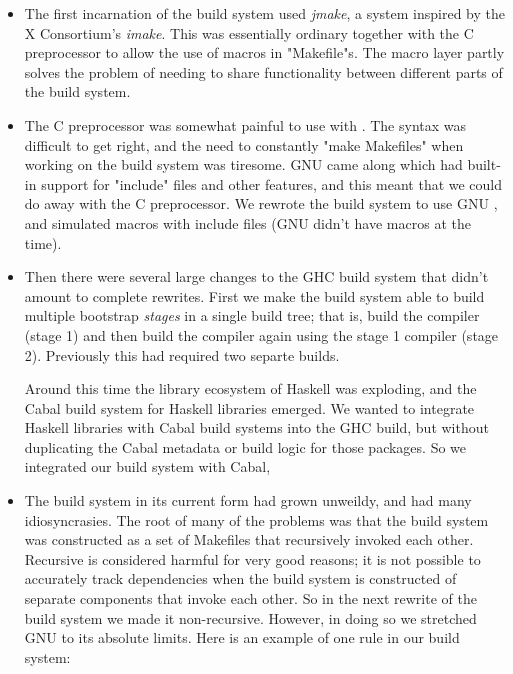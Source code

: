 \begin{itemize}
\item The first incarnation of the build system used \emph{jmake}, a
  system inspired by the X Consortium's \emph{imake}.  This was
  essentially ordinary \make{} together with the C preprocessor to
  allow the use of macros in \lst"Makefile"s.  The macro layer partly
  solves the problem of needing to share functionality between
  different parts of the build system.

\item The C preprocessor was somewhat painful to use with \make{}.
  The syntax was difficult to get right, and the need to constantly
  \lst"make Makefiles" when working on the build system was tiresome.  GNU
  \make{} came along which had built-in support for \lst"include" files and
  other features, and this meant that we could do away with the C
  preprocessor.  We rewrote the build system to use GNU \make{}, and
  simulated macros with include files (GNU \make{} didn't have macros at
  the time).

\item Then there were several large changes to the GHC build system
  that didn't amount to complete rewrites.  First we make the build
  system able to build multiple bootstrap \emph{stages} in a single
  build tree; that is, build the compiler (stage 1) and then build the
  compiler again using the stage 1 compiler (stage 2).  Previously
  this had required two separte builds.

  Around this time the library ecosystem of Haskell was exploding, and
  the Cabal build system for Haskell libraries emerged.  We wanted to
  integrate Haskell libraries with Cabal build systems into the GHC
  build, but without duplicating the Cabal metadata or build logic for
  those packages.  So we integrated our build system with Cabal,

\item The build system in its current form had grown unweildy, and had
  many idiosyncrasies.  The root of many of the problems was that the
  build system was constructed as a set of Makefiles that recursively
  invoked each other.  Recursive \make{} is considered harmful
  \cite{recursive-make} for very good reasons; it is not possible to
  accurately track dependencies when the build system is constructed
  of separate components that invoke each other.  So in the next
  rewrite of the build system we made it non-recursive.  However,
  in doing so we stretched GNU \make{} to its absolute limits.  Here is
  an example of one rule in our build system:


\end{itemize}
